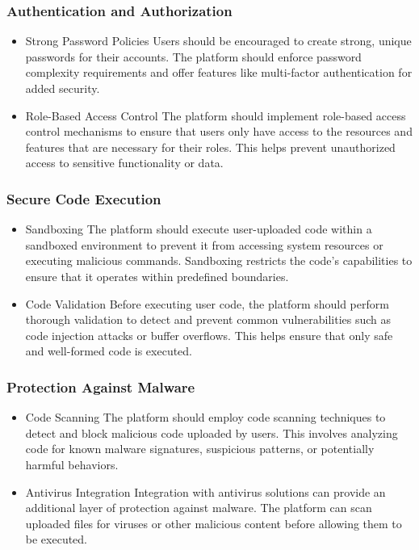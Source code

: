 \subsubsection{Authentication and Authorization}

\begin{itemize}
    \item{Strong Password Policies}
    Users should be encouraged to create strong, unique passwords for their accounts. The 	platform should enforce password complexity requirements and offer features like multi-factor authentication for added security.
    
    \item{Role-Based Access Control}
    The platform should implement role-based access control mechanisms to ensure that users only have access to the resources and features that are necessary for their roles. This helps prevent unauthorized access to sensitive functionality or data.
    
\end{itemize}

\subsubsection{Secure Code Execution}

\begin{itemize}
    \item {Sandboxing}
    The platform should execute user-uploaded code within a sandboxed environment to prevent it from accessing system resources or executing malicious commands. Sandboxing restricts the code's capabilities to ensure that it operates within predefined boundaries.
    \item {Code Validation}
    Before executing user code, the platform should perform thorough validation to detect and prevent common vulnerabilities such as code injection attacks or buffer overflows. This helps ensure that only safe and well-formed code is executed.
\end{itemize}

\subsubsection{Protection Against Malware}

\begin{itemize}
    \item {Code Scanning}
    The platform should employ code scanning techniques to detect and block malicious code uploaded by users. This involves analyzing code for known malware signatures, suspicious patterns, or potentially harmful behaviors.
    \item {Antivirus Integration}
    Integration with antivirus solutions can provide an additional layer of protection against malware. The platform can scan uploaded files for viruses or other malicious content before allowing them to be executed.
\end{itemize}


